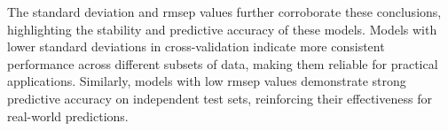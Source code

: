 The standard deviation and \gls{rmsep} values further corroborate these conclusions, highlighting the stability and predictive accuracy of these models.
Models with lower standard deviations in cross-validation indicate more consistent performance across different subsets of data, making them reliable for practical applications.
Similarly, models with low \gls{rmsep} values demonstrate strong predictive accuracy on independent test sets, reinforcing their effectiveness for real-world predictions.

